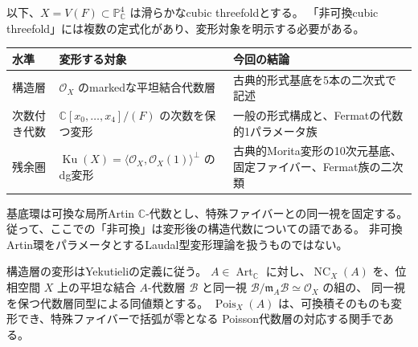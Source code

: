\documentclass[a4paper,11pt]{ltjsarticle}
\newcommand{\mathscr}{\mathcal}
\theoremstyle{definition}
\newcommand{\CC}{\mathbb C}
\newcommand{\OO}{\mathcal O}
\newcommand{\PP}{\mathbb P}
\newcommand{\Ku}{\operatorname{Ku}}
\newcommand{\Art}{\operatorname{Art}_{\CC}}
\newcommand{\NC}{\operatorname{NC}}
\newcommand{\Pois}{\operatorname{Pois}}
\newcommand{\frakm}{\mathfrak m}
\begin{document}
以下、$X=V(F)\subset\PP^4_{\CC}$ は滑らかなcubic threefoldとする。
「非可換cubic threefold」には複数の定式化があり、変形対象を明示する必要がある。

\begin{center}
\small
\begin{tabular}{p{}p{}p{}}
\toprule
水準 & 変形する対象 & 今回の結論\\
\midrule
構造層 &
$\OO_X$ のmarkedな平坦結合代数層 &
古典的形式基底を5本の二次式で記述\\
次数付き代数 &
$\CC[x_0,\ldots,x_4]/(F)$ の次数を保つ変形 &
一般の形式構成と、Fermatの代数的1パラメータ族\\
残余圏 &
$\Ku(X)=\langle\OO_X,\OO_X(1)\rangle^\perp$ のdg変形 &
古典的Morita変形の10次元基底、固定ファイバー、Fermat族の二次類\\
\bottomrule
\end{tabular}
\end{center}

基底環は可換な局所Artin $\CC$-代数とし、特殊ファイバーとの同一視を固定する。
従って、ここでの「非可換」は変形後の構造代数についての語である。
非可換Artin環をパラメータとするLaudal型変形理論を扱うものではない。

構造層の変形はYekutieliの定義\cite[Definitions 2.7--2.8]{Yek}に従う。
$A\in\Art$ に対し、$\NC_X(A)$ を、位相空間 $X$ 上の平坦な結合 $A$-代数層
$\mathscr B$ と同一視 $\mathscr B/\frakm_A\mathscr B\simeq\OO_X$ の組の、
同一視を保つ代数層同型による同値類とする。
$\Pois_X(A)$ は、可換積そのものも変形でき、特殊ファイバーで括弧が零となる
Poisson代数層の対応する関手である。
\end{document}
